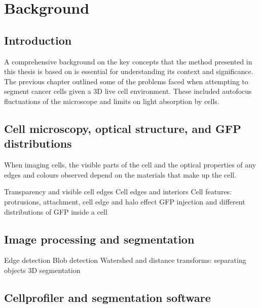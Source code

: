
\chapter{Background}

\ifpdf
    \graphicspath{{Chapter3/Figs/Raster/}{Chapter3/Figs/PDF/}{Chapter3/Figs/}}
\else
    \graphicspath{{Chapter3/Figs/Vector/}{Chapter3/Figs/}}
\fi

\section{Introduction}

A comprehensive background on the key concepts that the method presented in this thesis is based on is essential for understanding its context and significance. The previous chapter outlined some of the problems faced when attempting to segment cancer cells given a 3D live cell environment. These included autofocus fluctuations of the microscope and limits on light absorption by cells.

\section{Cell microscopy, optical structure, and GFP distributions}

When imaging cells, the visible parts of the cell and the optical properties of any edges and colours observed depend on the materials that make up the cell.

Transparency and visible cell edges
Cell edges and interiors
Cell features: protrusions, attachment, cell edge and halo effect
GFP injection and different distributions of GFP inside a cell

\section{Image processing and segmentation}

Edge detection
Blob detection
Watershed and distance transforms: separating objects
3D segmentation

\section{Cellprofiler and segmentation software}

